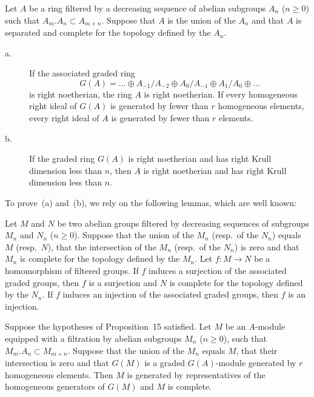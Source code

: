 \begin{proposition}
Let $A$ be a ring filtered by a decreasing sequence of abelian
subgroups $A_n$ ($n\ge0$) such that $A_m.A_n\subset A_{m+n}$.
Suppose that $A$ is the union of the $A_n$ and that $A$ is separated
and complete for the topology defined by the $A_n$.
\begin{description}
\item[\normalfont a.] If the associated graded ring
\[
G(A)=\ldots\oplus A_{-1}/A_{-2}\oplus A_0/A_{-1}\oplus A_1/A_0
\oplus\ldots
\]
is right noetherian, the ring $A$ is right noetherian. If every
homogeneous right ideal of $G(A)$ is generated by fewer than $r$
homogeneous elements, every right ideal of $A$ is generated by fewer
than $r$ elements.
\item[\normalfont b.] If the graded ring $G(A)$ is right noetherian and
has right Krull dimension less than $n$, then $A$ is right noetherian
and has right Krull dimension less than $n$.
\end{description}
\end{proposition}

To prove~(a) and~(b), we rely on the following lemmas, which are well
known:

\begin{lemma}
Let $M$ and $N$ be two abelian groups filtered by decreasing sequences
of subgroups $M_n$ and $N_n$ ($n\ge0$). Suppose that the union of the
$M_n$ (resp.~of the $N_n$) equals $M$ (resp.~$N$), that the
intersection of the $M_n$ (resp.~of the $N_n$) is zero and that $M_n$
is complete for the topology defined by the $M_n$. Let $f:M\to N$ be a
homomorphism of filtered groups. If $f$ induces a surjection of the
associated graded groups, then $f$ is a surjection and $N$ is complete
for the topology defined by the $N_n$. If $f$ induces an injection of
the associated graded groups, then $f$ is an injection.
\end{lemma}

\begin{lemma}
Suppose the hypotheses of Proposition~15 satisfied. Let $M$ be an
$A$-module equipped with a filtration by abelian subgroups $M_n$
($n\ge0$), such that $M_m.A_n\subset M_{m+n}$. Suppose that the union
of the $M_n$ equals $M$, that their intersection is zero and that
$G(M)$ is a graded $G(A)$-module generated by $r$ homogeneous
elements. Then $M$ is generated by representatives of the homogeneous
generators of $G(M)$ and $M$ is complete.
\end{lemma}


